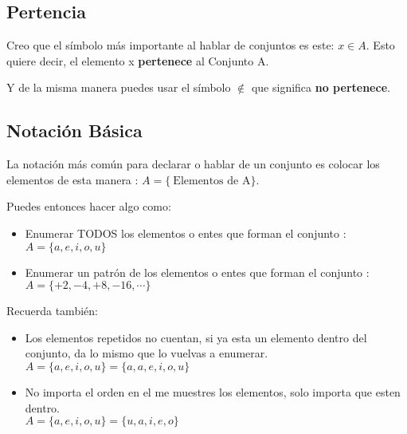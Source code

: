 \documentclass[12pt]{report}                                    %
\begin{document}
                \subsection{Pertencia}

                Creo que el símbolo más importante al hablar de conjuntos es este: $x \in A $. Esto quiere decir,
                el elemento x \textbf{pertenece} al Conjunto A.

                
                Y de la misma manera puedes usar el símbolo $\notin$ que significa \textbf{no pertenece}.


                \subsection{Notación Básica}

                    La notación más común para declarar o hablar de un conjunto es colocar los elementos de esta
                    manera : $ A = \{\ \text{Elementos de A} \}$.

                    Puedes entonces hacer algo como:

                    \begin{itemize}
                        \item Enumerar TODOS los elementos o entes que forman el conjunto :
                        \\$A = \{a, e, i, o, u\}$

                        \item Enumerar un patrón de los elementos o entes que forman el conjunto :
                        \\$A = \{+2, -4, +8, -16, \cdots \}$
                    \end{itemize}


                    Recuerda también:

                    \begin{itemize}
                        \item Los elementos repetidos no cuentan, si ya esta un elemento dentro del
                            conjunto, da lo mismo que lo vuelvas a enumerar.\\
                            $A = \{a, e, i, o, u\} = \{a, a, e, i, o, u\}$

                        \item No importa el orden en el me muestres los elementos,
                            solo importa que esten dentro.\\
                            $A = \{a, e, i, o, u\} = \{u, a, i, e, o\}$
                    \end{itemize}
\end{document}
